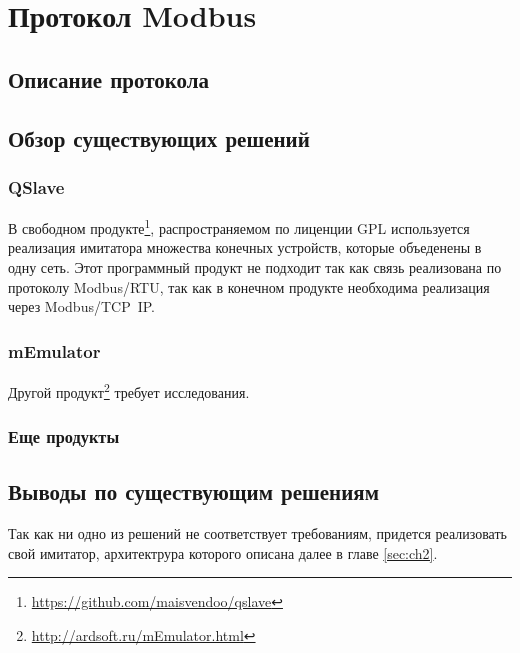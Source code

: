 
\chapter{Протокол Modbus}\label{ch:ch2}

\section{Описание протокола}

\section{Обзор существующих решений}\label{sec:ch2/sec1}
\subsection{QSlave}

В свободном продукте\footnote{\url{https://github.com/maisvendoo/qslave}}, распространяемом по лиценции GPL используется
реализация имитатора множества конечных устройств, которые объеденены в одну сеть.
Этот программный продукт не подходит так как связь реализована по протоколу
Modbus/RTU, так как в конечном продукте необходима реализация через Modbus/TCP~IP.

\subsection{mEmulator}
Другой продукт\footnote{\url{http://ardsoft.ru/mEmulator.html}} требует исследования.


\subsection{Еще продукты}


\section{Выводы по существующим решениям}

Так как ни одно из решений не соответствует требованиям, придется реализовать свой
имитатор, архитектрура которого описана далее в главе \ref{sec:ch2}.
